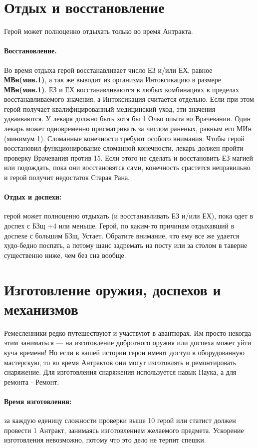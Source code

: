 \section{Отдых и восстановление}
Герой может полноценно отдыхать только во время Антракта.
\paragraph{Восстановление.} Во время отдыха герой восстанавливает число ЕЗ и/или ЕХ, равное \textbf{МВн(мин.1)}, а так же выводит из организма Интоксикацию в размере \textbf{МВн(мин.1)}. ЕЗ и ЕХ восстанавливаются в любых комбинациях в пределах восстанавливаемого значения, а Интоксикация считается отдельно.
\newline Если при этом герой получает квалифицированный медицинский уход, эти значения удваиваются. У лекаря должно быть хотя бы 1 Очко опыта во Врачевании. Один лекарь может одновременно присматривать за числом раненых, равным его МИн (минимум 1).
\newline Сломанные конечности требуют особого внимания. Чтобы герой восстановил функционирование сломанной конечности, лекарь должен пройти проверку Врачевания против 15. Если этого не сделать и восстановить ЕЗ магией или подождать, пока они восстановятся сами, конечность срастется неправильно и герой получит недостаток Старая Рана.
\paragraph{Отдых и доспехи:} герой может полноценно отдыхать (и восстанавливать ЕЗ и/или ЕХ), пока одет в доспех с БЗщ +4 или меньше. Герой, по каким-то причинам отдыхавший в доспехе с большим БЗщ, Устает. Обратите внимание, что ему все же удается худо-бедно поспать, а потому шанс задремать на посту или за столом в таверне существенно ниже, чем без сна вообще.
\section{Изготовление оружия, доспехов и механизмов}
Ремесленники редко путешествуют и участвуют в авантюрах. Им просто некогда этим заниматься — на изготовление добротного оружия или доспеха может уйти куча времени! Но если в вашей истории герои имеют доступ в оборудованную мастерскую, то во время Антрактов они могут изготовлять и ремонтировать снаряжение. Для изготовления снаряжения используется навык Наука, а для ремонта - Ремонт.
\paragraph{Время изготовления:} за каждую еденицу сложности проверки выше 10 герой или статист должен провести 1 Антракт, занимаясь изготовлением желаемого предмета. Ускорение изготовления невозможно, потому что это дело не терпит спешки.
